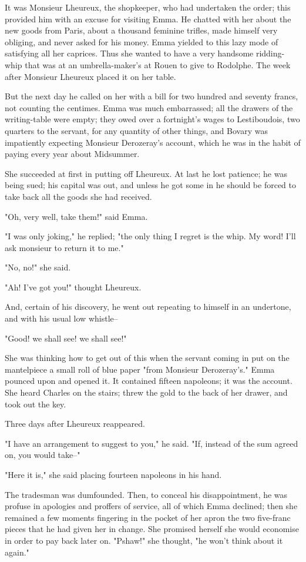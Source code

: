 \documentclass{tufte-book}
\begin{document}
It was Monsieur Lheureux, the shopkeeper, who had undertaken the order;
this provided him with an excuse for visiting Emma. He chatted with her
about the new goods from Paris, about a thousand feminine trifles, made
himself very obliging, and never asked for his money. Emma yielded to
this lazy mode of satisfying all her caprices. Thus she wanted to have
a very handsome ridding-whip that was at an umbrella-maker's at Rouen
to give to Rodolphe. The week after Monsieur Lheureux placed it on her
table.

But the next day he called on her with a bill for two hundred and
seventy francs, not counting the centimes. Emma was much embarrassed;
all the drawers of the writing-table were empty; they owed over a
fortnight's wages to Lestiboudois, two quarters to the servant, for any
quantity of other things, and Bovary was impatiently expecting Monsieur
Derozeray's account, which he was in the habit of paying every year
about Midsummer.

She succeeded at first in putting off Lheureux. At last he lost
patience; he was being sued; his capital was out, and unless he got some
in he should be forced to take back all the goods she had received.

"Oh, very well, take them!" said Emma.

"I was only joking," he replied; "the only thing I regret is the whip.
My word! I'll ask monsieur to return it to me."

"No, no!" she said.

"Ah! I've got you!" thought Lheureux.

And, certain of his discovery, he went out repeating to himself in an
undertone, and with his usual low whistle--

"Good! we shall see! we shall see!"

She was thinking how to get out of this when the servant coming in
put on the mantelpiece a small roll of blue paper "from Monsieur
Derozeray's." Emma pounced upon and opened it. It contained fifteen
napoleons; it was the account. She heard Charles on the stairs; threw
the gold to the back of her drawer, and took out the key.

Three days after Lheureux reappeared.

"I have an arrangement to suggest to you," he said. "If, instead of the
sum agreed on, you would take--"

"Here it is," she said placing fourteen napoleons in his hand.

The tradesman was dumfounded. Then, to conceal his disappointment, he
was profuse in apologies and proffers of service, all of which Emma
declined; then she remained a few moments fingering in the pocket of
her apron the two five-franc pieces that he had given her in change.
She promised herself she would economise in order to pay back later on.
"Pshaw!" she thought, "he won't think about it again."
\end{document}
